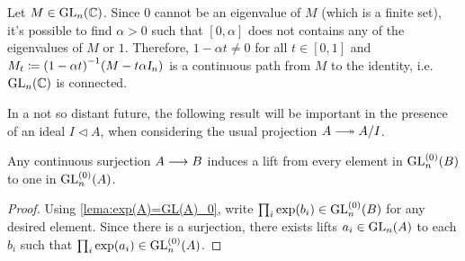 \begin{observacao}
    Let $M\in \operatorname{GL}_n(\operatorname{\mathbb{C}})$. Since $0$ cannot be an eigenvalue of $M$ (which is a finite set), it's possible to find $\alpha > 0$ such that $[0, \alpha]$ does not contains any of the eigenvalues of $M$ or $1$. Therefore, $1-\alpha t \neq 0$ for all $t\in [0,1]$ and $M_t \coloneqq {(1-\alpha t)}^{-1}(M-t\alpha \textsl{I}_n)$ is a continuous path from $M$ to the identity, i.e. $\operatorname{GL}_n(\operatorname{\mathbb{C}})$ is connected. 
\end{observacao}


In a not so distant future, the following result will be important in the presence of an ideal $I\triangleleft A$, when considering the usual projection $A \longtwoheadrightarrow A/I$.

\begin{corolario}\label{corol:lift by surjection}
    Any continuous surjection $A \longrightarrow B$ induces a lift from every element in $\operatorname{GL}_n^{(0)}(B)$ to one in $\operatorname{GL}_n^{(0)}(A)$.
    \begin{proof}
        Using \ref*{lema:exp(A)=GL(A)_0}, write $\prod_i \exp(b_i) \in \operatorname{GL}_n^{(0)}(B)$ for any desired element. Since there is a surjection, there exists lifts $a_i \in \operatorname{GL}_n(A)$ to each $b_i$  such that $\prod_i \exp(a_i) \in \operatorname{GL}_n^{(0)}(A)$.
    \end{proof}
\end{corolario}

